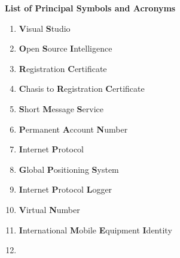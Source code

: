 \thispagestyle{plain}
\begin{raggedleft}
    \Huge \textbf{{List of Principal Symbols and Acronyms}}
\end{raggedleft}

\vspace{3\baselineskip}

\begin{enumerate}
    \item[]  \fontsize{14}{16}\selectfont \textbf{V}isual \textbf{S}tudio
    \item[]  \fontsize{14}{16}\selectfont \textbf{O}pen \textbf{S}ource \textbf{I}ntelligence
    \item[]  \fontsize{14}{16}\selectfont \textbf{R}egistration \textbf{C}ertificate
    \item[]  \fontsize{14}{16}\selectfont \textbf{C}hasis to \textbf{R}egistration \textbf{C}ertificate
    \item[]  \fontsize{14}{16}\selectfont \textbf{S}hort \textbf{M}essage \textbf{S}ervice
    \item[]  \fontsize{14}{16}\selectfont \textbf{P}ermanent \textbf{A}ccount \textbf{N}umber
    \item[]  \fontsize{14}{16}\selectfont \textbf{I}nternet \textbf{P}rotocol
    \item[]  \fontsize{14}{16}\selectfont \textbf{G}lobal \textbf{P}ositioning \textbf{S}ystem
    \item[]  \fontsize{14}{16}\selectfont \textbf{I}nternet \textbf{P}rotocol \textbf{L}ogger
    \item[]  \fontsize{14}{16}\selectfont \textbf{V}irtual \textbf{N}umber
    \item[]  \fontsize{14}{16}\selectfont 
    \textbf{I}nternational \textbf{M}obile \textbf{E}quipment \textbf{I}dentity
    \item[]  \fontsize{14}{16}\selectfont 

\end{enumerate}
